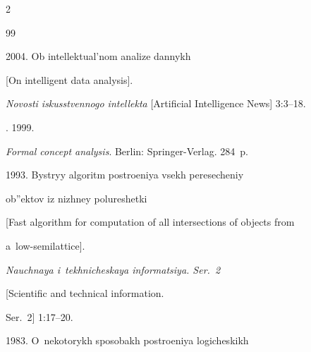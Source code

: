 















  \begin{multicols}{2}



\renewcommand{\bibname}{\protect\rmfamily References}




{\small\frenchspacing

 {%


 \begin{thebibliography}{99} 


 2004. Ob intellektual'nom analize dannykh 

[On intelligent data analysis]. 

\textit{Novosti iskusstvennogo intellekta} [Artificial Intelligence News] 3:3--18.


. 1999. 

\textit{Formal concept analysis}. Berlin: Springer-Verlag. 284~p.


 1993. Bystryy algoritm postroeniya vsekh peresecheniy 

ob''ektov iz nizhney polureshetki 

[Fast algorithm for computation of all intersections of objects from 

a~low-semilattice]. 

\textit{Nauchnaya i~tekhnicheskaya informatsiya. Ser.~2} 

[Scientific and technical information. 

Ser.~2] 1:17--20.


 1983. O~nekotorykh sposobakh po\-stro\-eniya logicheskikh 


\end{thebibliography}}}
\end{multicols}
